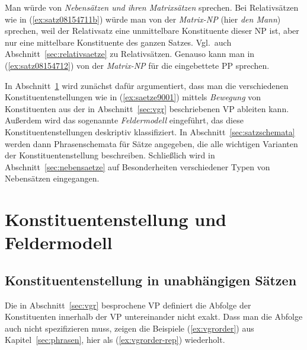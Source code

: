 Man würde von \textit{Nebensätzen und ihren Matrixsätzen} sprechen.
Bei Relativsätzen wie in (\ref{ex:satz08154711b}) würde man von der \textit{Matrix-NP} (hier \textit{den Mann}) sprechen, weil der Relativsatz eine unmittelbare Konstituente dieser NP ist, aber nur eine mittelbare Konstituente des ganzen Satzes.
Vgl.\ auch Abschnitt~\ref{sec:relativsaetze} zu Relativsätzen.
Genauso kann man in (\ref{ex:satz08154712}) von der \textit{Matrix-NP} für die eingebettete PP sprechen.

\begin{exe}
\end{exe}

In Abschnitt~\ref{sec:felder} wird zunächst dafür argumentiert, dass man die verschiedenen Konstituentenstellungen wie in (\ref{ex:saetze9001}) mittels \textit{Bewegung} von Konstituenten aus der in Abschnitt~\ref{sec:vgr} beschriebenen VP ableiten kann.
Außerdem wird das sogenannte \textit{Feldermodell} eingeführt, das diese Konstituentenstellungen deskriptiv klassifiziert.
In Abschnitt~\ref{sec:satzschemata} werden dann Phrasenschemata für Sätze angegeben, die alle wichtigen Varianten der Konstituentenstellung beschreiben.
Schließlich wird in Abschnitt~\ref{sec:nebensaetze} auf Besonderheiten verschiedener Typen von Nebensätzen eingegangen.




\section{Konstituentenstellung und Feldermodell}

\label{sec:felder}

\subsection{Konstituentenstellung in unabhängigen Sätzen}

Die in Abschnitt~\ref{sec:vgr} besprochene VP definiert die Abfolge der Konstituenten innerhalb der VP untereinander nicht exakt.
Dass man die Abfolge auch nicht spezifizieren muss, zeigen die Beispiele (\ref{ex:vgrorder}) aus Kapitel~\ref{sec:phrasen}, hier als (\ref{ex:vgrorder-rep}) wiederholt.

